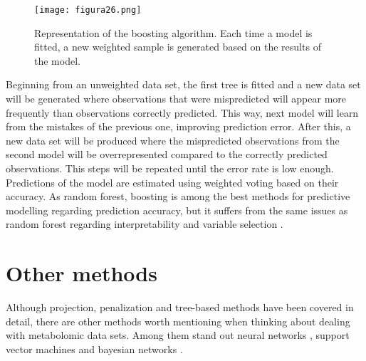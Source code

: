 \begin{figure}[hbtp]
\centering
\texttt{[image: figura26.png]}
\caption{Representation of the boosting algorithm. Each time a model is fitted, a new weighted sample is generated based on the results of the model.}
\label{figura26}
\end{figure}

Beginning from an unweighted data set, the first tree is fitted and a new data set will be generated where observations that were mispredicted will appear more frequently than observations correctly predicted. This way, next model will learn from the mistakes of the previous one, improving prediction error. After this, a new data set will be produced where the mispredicted observations from the second model will be overrepresented compared to the correctly predicted observations. This steps will be repeated until the error rate is low enough. Predictions of the model are estimated using weighted voting based on their accuracy. As random forest, boosting is among the best methods for predictive modelling regarding prediction accuracy, but it suffers from the same issues as random forest regarding interpretability and variable selection \parencite{auret2011empirical}.

\section{Other methods}
Although projection, penalization and tree-based methods have been covered in detail, there are other methods worth mentioning when thinking about dealing with metabolomic data sets. Among them stand out neural networks \parencite{dayhoff2001artificial}, support vector machines \parencite{mahadevan2008analysis} and bayesian networks \parencite{bartel2013statistical}.